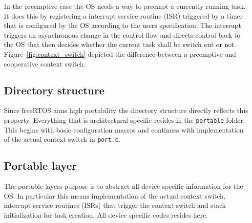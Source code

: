 In the preemptive case the OS needs a way to preempt a currently running task. It does this by registering a interrupt service routine (ISR) triggered by a timer that is configured by the OS according to the users specification. The interrupt triggers an asynchronous change in the control flow and directs control back to the OS that then decides whether the current task shall be switch out or not. Figure~\ref{fig:context_switch} depicted the difference between a preemptive and cooperative context switch.

\subsection{Directory structure}

Since freeRTOS aims high portability the directory structure directly reflects this property. Everything that is architectural specific resides in the \verb+portable+ folder. This begins with basic configuration macros and continues with implementation of the actual context switch in \verb+port.c+.

\begin{flushleft}
\end{flushleft}

\subsection{Portable layer}

The portable layers purpose is to abstract all device specific information for the OS. In particular this means implementation of the actual context switch, interrupt service routines (ISRs) that trigger the context switch and stack initialization for task creation. All device specific codes resides here.

